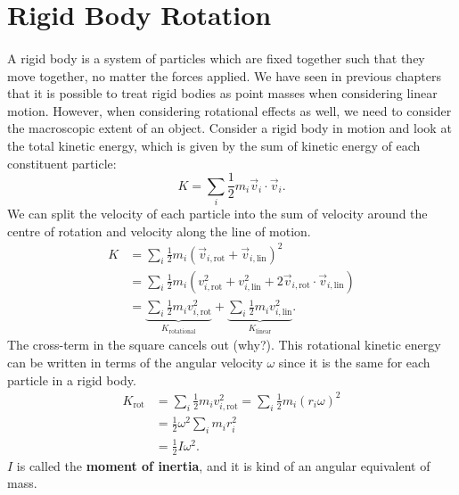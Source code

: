 \documentclass[../classical_mechanics.tex]{subfiles}
\begin{document}
    \section{Rigid Body Rotation}
        \paragraph{}
        A rigid body is a system of particles which are fixed together such that they move together, no matter the forces applied.
        We have seen in previous chapters that it is possible to treat rigid bodies as point masses when considering linear motion.
        However, when considering rotational effects as well, we need to consider the macroscopic extent of an object.
        Consider a rigid body in motion and look at the total kinetic energy, which is given by the sum of kinetic energy of each constituent particle:
        \begin{equation}
            K=\sum_i\frac{1}{2}m_i\vec{v}_i\cdot\vec{v}_i.
        \end{equation}
        We can split the velocity of each particle into the sum of velocity around the centre of rotation and velocity along the line of motion.
        \begin{align}
            K&=\sum_i\frac{1}{2}m_i(\vec{v}_{i,\text{rot}}+\vec{v}_{i,\text{lin}})^2\\
            &=\sum_i\frac{1}{2}m_i(v_{i,\text{rot}}^2+v_{i,\text{lin}}^2+2\vec{v}_{i,\text{rot}}\cdot\vec{v}_{i,\text{lin}})\\
            &=\underbrace{\sum_i\frac{1}{2}m_iv_{i,\text{rot}}^2}_{K_\text{rotational}}+\underbrace{\sum_i\frac{1}{2}m_iv_{i,\text{lin}}^2}_{K_\text{linear}}.
        \end{align}
        The cross-term in the square cancels out (why?).
        This rotational kinetic energy can be written in terms of the angular velocity $\omega$ since it is the same for each particle in a rigid body.
        \begin{align}
            K_\text{rot}&=\sum_i\frac{1}{2}m_iv_{i,\text{rot}}^2=\sum_i\frac{1}{2}m_i(r_i\omega)^2\\
            &=\frac{1}{2}\omega^2\sum_i m_ir_i^2\\
            &=\frac{1}{2}I\omega^2.
        \end{align}
        $I$ is called the \textbf{moment of inertia}, and it is kind of an angular equivalent of mass.
\end{document}
